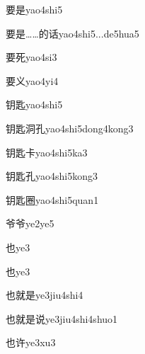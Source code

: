 \begin{verbete}[9;9]{要是}{yao4shi5}
\end{verbete}
\begin{verbete}[9;9;8;8]{要是……的话}{yao4shi5...de5hua5}
\end{verbete}
\begin{verbete}[9;6]{要死}{yao4si3}
\end{verbete}
\begin{verbete}[9;3]{要义}{yao4yi4}
\end{verbete}
\begin{verbete}[9;11]{钥匙}{yao4shi5}
\end{verbete}
\begin{verbete}[9;11;9;4]{钥匙洞孔}{yao4shi5dong4kong3}
\end{verbete}
\begin{verbete}[9;11;5]{钥匙卡}{yao4shi5ka3}
\end{verbete}
\begin{verbete}[9;11;4]{钥匙孔}{yao4shi5kong3}
\end{verbete}
\begin{verbete}[9;11;11]{钥匙圈}{yao4shi5quan1}
\end{verbete}
\begin{verbete}[6;6]{爷爷}{ye2ye5}
\end{verbete}
\begin{verbete}[3]{也}{ye3}
\end{verbete}
\begin{verbete*}[3]{也}{ye3}
\end{verbete*}
\begin{verbete}[3;12;9]{也就是}{ye3jiu4shi4}
\end{verbete}
\begin{verbete}[3;12;9;9]{也就是说}{ye3jiu4shi4shuo1}
\end{verbete}
\begin{verbete}[3;6]{也许}{ye3xu3}
\end{verbete}
